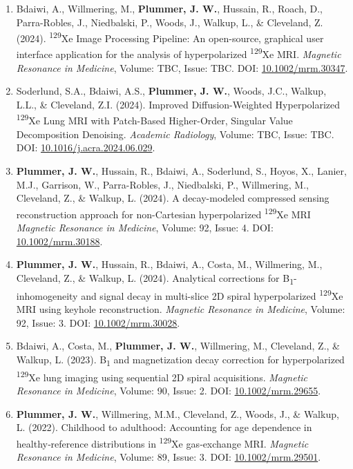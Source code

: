 \documentclass[12pt,]{scrartcl}
\begin{document}
\begin{enumerate}
    \item Bdaiwi, A., Willmering, M., \textbf{Plummer, J. W.}, Hussain, R., Roach, D., Parra-Robles, J., Niedbalski, P., Woods, J., Walkup, L., \& Cleveland, Z. (2024). \textsuperscript{129}Xe Image Processing Pipeline: An open-source, graphical user interface application for the analysis of hyperpolarized \textsuperscript{129}Xe MRI. \textit{Magnetic Resonance in Medicine}, Volume: TBC, Issue: TBC. DOI: \href{https://doi.org/10.1002/mrm.30347}{10.1002/mrm.30347}.
  
    \item Soderlund, S.A., Bdaiwi, A.S., \textbf{Plummer, J. W.}, Woods, J.C., Walkup, L.L., \& Cleveland, Z.I. (2024). Improved Diffusion-Weighted Hyperpolarized \textsuperscript{129}Xe Lung MRI with Patch-Based Higher-Order, Singular Value Decomposition Denoising. \textit{Academic Radiology}, Volume: TBC, Issue: TBC. DOI: \href{https://doi.org/10.1016/j.acra.2024.06.029}{10.1016/j.acra.2024.06.029}.
  
    \item  \textbf{Plummer, J. W.}, Hussain, R., Bdaiwi, A., Soderlund, S., Hoyos, X., Lanier, M.J., Garrison, W., Parra-Robles, J., Niedbalski, P., Willmering, M., Cleveland, Z., \& Walkup, L. (2024). A decay-modeled compressed sensing reconstruction approach for non-Cartesian hyperpolarized \textsuperscript{129}Xe MRI \textit{Magnetic Resonance in Medicine}, Volume: 92, Issue: 4.
    DOI: \href{https://doi.org/10.1002/mrm.30188}{10.1002/mrm.30188}.

    \item  \textbf{Plummer, J. W.}, Hussain, R., Bdaiwi, A., Costa, M., Willmering, M., Cleveland, Z., \& Walkup, L. (2024). Analytical corrections for B\textsubscript{1}-inhomogeneity and signal decay in multi-slice 2D spiral hyperpolarized \textsuperscript{129}Xe MRI using keyhole reconstruction. \textit{Magnetic Resonance in Medicine}, Volume: 92, Issue: 3. 
    DOI: \href{https://doi.org/10.1002/mrm.30028}{10.1002/mrm.30028}.
    
    \item  Bdaiwi, A., Costa, M., \textbf{Plummer, J. W.}, Willmering, M., Cleveland, Z., \& Walkup, L. (2023). B\textsubscript{1} and magnetization decay correction for hyperpolarized \textsuperscript{129}Xe lung imaging using sequential 2D spiral acquisitions. \textit{Magnetic Resonance in Medicine}, Volume: 90, Issue: 2. DOI: \href{ https://doi.org/10.1002/mrm.29655}{ 10.1002/mrm.29655}.
    
    \item \textbf{Plummer, J. W.}, Willmering, M.M., Cleveland, Z., Woods, J., \& Walkup, L. (2022). Childhood to adulthood: Accounting for age dependence in healthy‐reference distributions in \textsuperscript{129}Xe gas‐exchange MRI. \textit{Magnetic Resonance in Medicine}, Volume: 89, Issue: 3. DOI: \href{https://onlinelibrary.wiley.com/share/GVTXYDIF3Y2VPZRHQRIK?target=10.1002/mrm.29501}{10.1002/mrm.29501}.
    

\end{enumerate}
\end{document}
